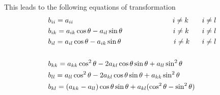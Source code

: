\documentclass[%
reprint,
amsmath,amssymb,
aps,
]{revtex4-1}
\begin{document}
\noindent
This leads to the following equations of transformation \vspace{1mm}
\begin{align*}
&b_{ii} = a_{ii} \hspace{49mm} i\not=k & i\not=l\\
&b_{ik} = a_{ik}\cos\theta -a_{il}\sin\theta \hspace{25mm} i\not=k & i\not=l \\
&b_{il}  = a_{il}\cos\theta -a_{ik}\sin\theta \hspace{26mm} i\not=k & i\not=l\\ &&\\
&b_{kk} = a_{kk}\cos^2\theta -2a_{kl}\cos\theta\sin\theta +a_{ll}\sin^2\theta&\\
&b_{ll} = a_{ll}\cos^2\theta -2a_{kl}\cos\theta\sin\theta +a_{kk}\sin^2\theta& \\
&b_{kl} = (a_{kk}-a_{ll})\cos\theta\sin\theta+a_{kl}(\cos^2\theta -\sin^2\theta)& \\
\end{align*}\begin{equation}
	\label{jacobimethod}
\end{equation}
\end{document}

